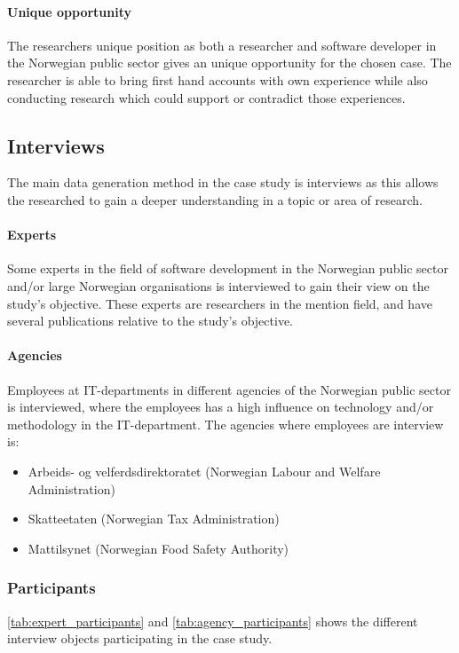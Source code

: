 \paragraph{Unique opportunity}
The researchers unique position as both a researcher and software developer in the Norwegian public sector gives an unique opportunity for the chosen case. The researcher is able to bring first hand accounts with own experience while also conducting research which could support or contradict those experiences.

\subsection{Interviews}
The main data generation method in the case study is interviews as this allows the researched to gain a deeper understanding in a topic or area of research.


\paragraph{Experts}
Some experts in the field of software development in the Norwegian public sector and/or large Norwegian organisations is interviewed to gain their view on the study's objective. These experts are researchers in the mention field, and have several publications relative to the study's objective.

\paragraph{Agencies}
Employees at IT-departments in different agencies of the Norwegian public sector is interviewed, where the employees has a high influence on technology and/or methodology in the IT-department. The agencies where employees are interview is:

\begin{itemize}
    \item Arbeids- og velferdsdirektoratet (Norwegian Labour and Welfare Administration)
    \item Skatteetaten (Norwegian Tax Administration)
    \item Mattilsynet (Norwegian Food Safety Authority)
\end{itemize}

\subsubsection{Participants}
\autoref{tab:expert_participants} and \autoref{tab:agency_participants} shows the different interview objects participating in the case study.

